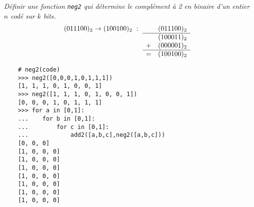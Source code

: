 \begin{td}[Complément à 2]\label{td:complement2}
\em
Définir une fonction {\tt neg2} qui détermine le complément à 2 en binaire 
d'un entier $n$ codé sur $k$ bits.
	$$(011100)_2 \rightarrow (100100)_2\ :\ \begin{array}[t]{lrr} 
	  & (011100)_2\\
	\hline
	  & (100011)_2\\
	+ & (000001)_2\\
	\hline
	= & (100100)_2
	\end{array}$$

	\begin{py}{7cm}
	\begin{verbatim}
	# neg2(code)
	>>> neg2([0,0,0,1,0,1,1,1])
	[1, 1, 1, 0, 1, 0, 0, 1]
	>>> neg2([1, 1, 1, 0, 1, 0, 0, 1])
	[0, 0, 0, 1, 0, 1, 1, 1]
	>>> for a in [0,1]:
	...    for b in [0,1]:
	...        for c in [0,1]:
	...            add2([a,b,c],neg2([a,b,c]))
	[0, 0, 0]
	[1, 0, 0, 0]
	[1, 0, 0, 0]
	[1, 0, 0, 0]
	[1, 0, 0, 0]
	[1, 0, 0, 0]
	[1, 0, 0, 0]
	[1, 0, 0, 0]
	\end{verbatim}
	\end{py}
\end{td}

